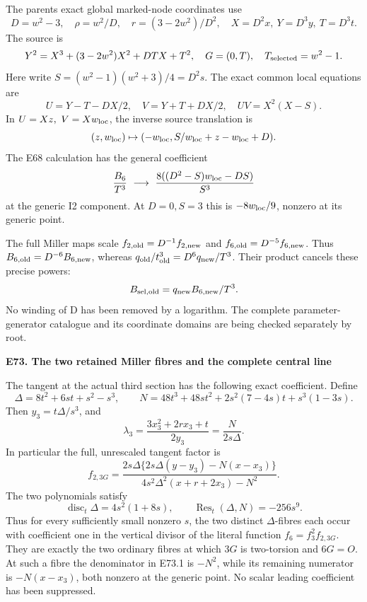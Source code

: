 \par\nobreak

The parent\textquotesingle s exact global marked-node coordinates use
\[
D=w^2-3,\quad \rho=w^2/D,\quad r=(3-2w^2)/D^2,\quad
X=D^2x,\ Y=D^3y,\ T=D^3t .
\]
The source is
\[
Y^2=X^3+(3-2w^2)X^2+DTX+T^2,\quad G=(0,T),\quad
T_{\rm selected}=w^2-1.
\]
Here write
\(S=(w^2-1)(w^2+3)/4=D^2s\).
The exact common local equations are
\[
U=Y-T-DX/2,\quad V=Y+T+DX/2,\quad UV=X^2(X-S).
\]
In \(U=Xz,\ V=Xw_{\rm loc}\), the inverse source translation is
\[
(z,w_{\rm loc})\mapsto
(-w_{\rm loc},S/w_{\rm loc}+z-w_{\rm loc}+D).
\]
The E68 calculation has the general coefficient
\[
 \frac{B_6}{T^3}\ \longrightarrow\
 \frac{8((D^2-S)w_{\rm loc}-DS)}{S^3}
\]
at the generic I2 component. At \(D=0,S=3\) this is
\(-8w_{\rm loc}/9\), nonzero at its generic point.

The full Miller maps scale
\(f_{2,\rm old}=D^{-1}f_{2,\rm new}\) and
\(f_{6,\rm old}=D^{-5}f_{6,\rm new}\). Thus
\(B_{6,\rm old}=D^{-6}B_{6,\rm new}\), whereas
\(q_{\rm old}/t_{\rm old}^3=D^6q_{\rm new}/T^3\).
Their product cancels these precise powers:
\[
 B_{\rm sel,old}=q_{\rm new}B_{6,\rm new}/T^3 .
\]
No winding of D has been removed by a logarithm. The complete
parameter-generator catalogue and its coordinate domains are
being checked separately by root.

\par

\medskip\noindent\textbf{E73. The two retained Miller fibres and the complete central line}

\par\nobreak

The tangent at the actual third section has the following exact
coefficient. Define
\[
\Delta=8t^2+6st+s^2-s^3,\qquad
N=48t^3+48st^2+2s^2(7-4s)t+s^3(1-3s).
\]
Then \(y_3=t\Delta/s^3\), and
\[
\lambda_3=\frac{3x_3^2+2rx_3+t}{2y_3}
          =\frac{N}{2s\Delta}.
\]
In particular the full, unrescaled tangent factor is
\[
 f_{2,3G}=
 \frac{2s\Delta\{2s\Delta(y-y_3)-N(x-x_3)\}}
 {4s^2\Delta^2(x+r+2x_3)-N^2}.                    \tag{E73.1}
\]
The two polynomials satisfy
\[
 \operatorname{disc}_t\Delta=4s^2(1+8s),\qquad
 \operatorname{Res}_t(\Delta,N)=-256s^9.          \tag{E73.2}
\]
Thus for every sufficiently small nonzero \(s\), the two distinct
\(\Delta\)-fibres each occur with coefficient one in the vertical
divisor of the literal function \(f_6=f_3^2f_{2,3G}\).
They are exactly the two ordinary fibres at which \(3G\) is
two-torsion and \(6G=O\). At such a fibre the denominator in
E73.1 is \(-N^2\), while its remaining numerator is
\(-N(x-x_3)\), both nonzero at the generic point. No scalar
leading coefficient has been suppressed.

